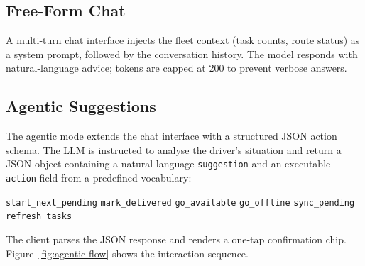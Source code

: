 \subsection{Free-Form Chat}
\label{sec:ai-chat}

A multi-turn chat interface injects the fleet context (task counts, route
status) as a system prompt, followed by the conversation history.  The model
responds with natural-language advice; tokens are capped at 200 to prevent
verbose answers.

\subsection{Agentic Suggestions}
\label{sec:ai-agentic}

The agentic mode extends the chat interface with a structured JSON action
schema.  The LLM is instructed to analyse the driver's situation and return a
JSON object containing a natural-language \texttt{suggestion} and an
executable \texttt{action} field from a predefined vocabulary:

\begin{center}
\small
\texttt{start\_next\_pending} \quad
\texttt{mark\_delivered} \quad
\texttt{go\_available} \quad
\texttt{go\_offline} \quad
\texttt{sync\_pending} \quad
\texttt{refresh\_tasks}
\end{center}

The client parses the JSON response and renders a one-tap confirmation chip.
Figure~\ref{fig:agentic-flow} shows the interaction sequence.

